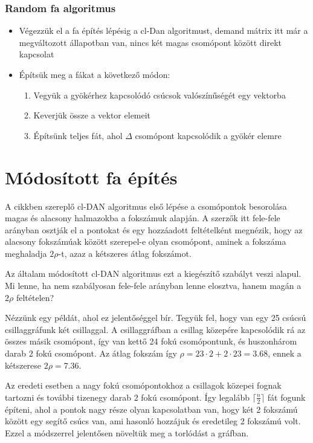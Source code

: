 \documentclass[12pt]{report}
\begin{document}
\subsubsection{Random fa algoritmus}
\begin{itemize}
	\item Végezzük el a fa építés lépésig a cl-Dan algoritmust, demand mátrix itt már a megváltozott állapotban van, nincs két magas csomópont között direkt kapcsolat
	\item Építsük meg a fákat a következő módon:
	\begin{enumerate}
		\item Vegyük a gyökérhez kapcsolódó csúcsok valószínűségét egy vektorba
		\item Keverjük össze a vektor elemeit
		\item Építsünk teljes fát, ahol $\Delta$ csomópont kapcsolódik a gyökér elemre
	\end{enumerate}
\end{itemize}

\section{Módosított fa építés}


A cikkben \cite{avin_demand-aware_nodate} szereplő cl-DAN algoritmus első lépése a csomópontok besorolása magas és alacsony halmazokba a fokszámuk alapján. 
A szerzők itt fele-fele arányban osztják el a pontokat és egy hozzáadott feltételként megnézik, hogy az alacsony fokszámúak között szerepel-e olyan csomópont, aminek a fokszáma meghaladja \(2\rho\)-t, azaz a kétszeres átlag fokszámot.

Az általam módosított cl-DAN algoritmus ezt a kiegészítő szabályt veszi alapul.
Mi lenne, ha nem szabályosan fele-fele arányban lenne elosztva, hanem magán a \(2\rho\) feltételen?

Nézzünk egy példát, ahol ez jelentőséggel bír.
Tegyük fel, hogy van egy 25 csúcsú csillaggráfunk két csillaggal.
A csillaggráfban a csillag közepére kapcsolódik rá az összes másik csomópont, így van kettő 24 fokú csomópontunk, és huszonhárom darab 2 fokú csomópont. 
Az átlag fokszám így \(\rho=23\cdot2+2\cdot23=3.68\), ennek a kétszerese \(2\rho=7.36\).

Az eredeti esetben a nagy fokú csomópontokhoz a csillagok közepei fognak tartozni és további tizenegy darab 2 fokú csomópont. 
Így legalább $\lceil\frac{n}{2}\rceil$ fát fogunk építeni, ahol a pontok nagy része olyan kapcsolatban van, hogy két 2 fokszámú között egy segítő csúcs van, ami hasonló hozzájuk és eredetileg 2 fokszámú volt. 
Ezzel a módszerrel jelentősen növeltük meg a torlódást a gráfban.
\end{document}

